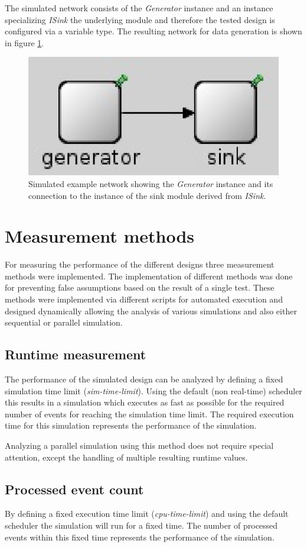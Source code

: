The simulated network consists of the \emph{Generator} instance and an instance specializing \emph{ISink} the underlying module and therefore the tested design is configured via a variable type.
The resulting network for data generation is shown in figure \ref{fig:omnet_example_network}.

\begin{figure}
    \centering
    \includegraphics[width=0.3\linewidth]{images/omnet_example_network}
    \caption{Simulated example network showing the \emph{Generator} instance and its connection to the instance of the sink module derived from \emph{ISink}.}
    \label{fig:omnet_example_network}
\end{figure}

\section{Measurement methods}
\label{sec:measurements_methods}
For measuring the performance of the different designs three measurement methods were implemented.
The implementation of different methods was done for preventing false assumptions based on the result of a single test.
These methods were implemented via different scripts for automated execution and designed dynamically allowing the analysis of various simulations and also either sequential or parallel simulation.

\subsection{Runtime measurement}
\label{sec:measurements_methods_runtime}
The performance of the simulated design can be analyzed by defining a fixed simulation time limit (\emph{sim-time-limit}).
Using the default (non real-time) scheduler this results in a simulation which executes as fast as possible for the required number of events for reaching the simulation time limit.
The required execution time for this simulation represents the performance of the simulation.

Analyzing a parallel simulation using this method does not require special attention, except the handling of multiple resulting runtime values.

\subsection{Processed event count}
\label{sec:measurements_methods_event}
By defining a fixed execution time limit (\emph{cpu-time-limit}) and using the default scheduler the simulation will run for a fixed time.
The number of processed events within this fixed time represents the performance of the simulation.

